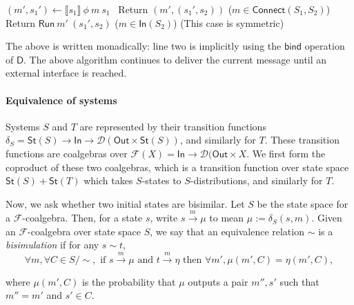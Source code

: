 \documentclass{article}
\begin{document}
\begin{algorithm}
\begin{algorithmic}[1]
        \State $(m', s_1') \leftarrow \llbracket s_1 \rrbracket\ \phi\ m\ s_1$
         \
            \State Return $(m', (s_1', s_2))$
        \Else 
            \State ($m \in \textsf{Connect}(S_1, S_2)$) 
            \State Return $\textsf{Run}\ m'\ (s_1', s_2)$
        \EndIf
    \Else
        \State ($m \in \textsf{In}(S_2)$)
        \State (This case is symmetric)
    \EndIf
\end{algorithmic}
\end{algorithm}

The above is written monadically: line two is implicitly using the $\textsf{bind}$ operation of $\textsf{D}$. The above algorithm continues to deliver the current message until an external interface is reached.


\paragraph{Equivalence of systems}

Systems $S$ and $T$ are represented by their transition functions $\delta_S = \textsf{St}(S) \to \textsf{In} \to \mathcal{D} (\textsf{Out} \times \textsf{St}(S))$, and similarly for $T$. These transition functions are coalgebras over $\mathcal{F}(X) = \textsf{In} \to \mathcal{D} (\textsf{Out} \times X$. We first form the coproduct of these two coalgebras, which is a transition function over state space $\textsf{St}(S) + \textsf{St}(T)$ which takes $S$-states to $S$-distributions, and similarly for $T$.

Now, we ask whether two initial states are bisimilar. 
Let $S$ be the state space for a $\mathcal{F}$-coalgebra. Then, for a state $s$, write $s \xrightarrow{m} \mu$ to mean $\mu := \delta_S (s,m)$.
Given an $\mathcal{F}$-coalgebra over state space $S$, we say that an equivalence relation $\sim$ is a \emph{bisimulation} if for any $s \sim t$,
\[ \forall m, \forall C \in S / \sim, \text{ if } s \xrightarrow{m} \mu \text{ and } t \xrightarrow{m} \eta \text{ then }  \forall m', \mu(m',C) = \eta(m',C),\]

where $\mu(m',C)$ is the probability that $\mu$ outputs a pair $m'', s'$ such that $m'' = m'$ and $s' \in C$.
\end{document}

